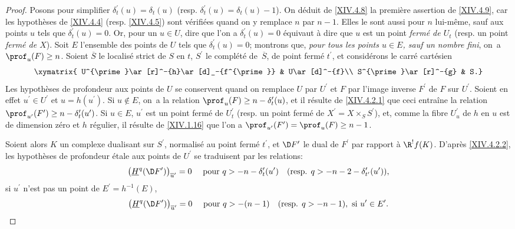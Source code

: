 \begin{proof}
Posons pour simplifier $\delta_{t}^{\prime}(u)=\delta_{t}(u)$ (resp. $\delta_{t}^{\prime}(u)=\delta_{t}(u)-1$). On d\'eduit de \ref{XIV.4.8} la premi\`ere assertion de \ref{XIV.4.9}, car les hypoth\`eses de \ref{XIV.4.4} (resp. \ref{XIV.4.5}) sont v\'erifi\'ees quand on y remplace $n$ par $n-1$. Elles le sont aussi pour $n$ lui-m\^eme, sauf aux points $u$ tels que $\delta_{t}^{\prime}(u)=0$. Or, pour un $u\in U$, dire que l'on a $\delta_{t}^{\prime}(u)=0$ \'equivaut \`a dire que $u$ est un point \emph{fermé de $U_{t}$} (resp. un point \emph{fermé de $X$}). Soit $E$ l'ensemble des points de $U$ tels que $\delta_{t}^{\prime}(u)=0$; montrons que, \emph{pour tous les points $u\in E$, sauf un nombre fini}, on~a $\prof_{u}(F)\geq n$. Soient $\overline{S}$ le localis\'e strict de $S$ en $t$, $S^{\prime}$ le compl\'et\'e de~$\overline{S}$, de point ferm\'e $t^{\prime}$, et consid\'erons le carr\'e cart\'esien
$$
\xymatrix{ U^{\prime}\ar[r]^-{h}\ar[d]_-{f^{\prime}} & U\ar[d]^-{f}\\
S^{\prime}\ar[r]^-{g} & S.}$$
Les hypoth\`eses de profondeur aux points de $U$ se conservent quand on remplace $U$ par $U^{\prime}$ et $F$ par l'image inverse $F^{\prime}$ de $F$ sur $U^{\prime}$. Soient en effet $u^{\prime}\in U^{\prime}$ et $u=h(u^{\prime})$. Si $u\not\in E$, on~a la relation $\prof_{u}(F)\geq n-\delta_{t}^{\prime}(u)$, et il r\'esulte de \ref{XIV.4.2.1} que ceci entra\^ine la relation $\prof_{u^{\prime}}(F^{\prime})\geq n-\delta_{t}^{\prime}(u^{\prime})$. Si $u\in E$, $u^{\prime}$ est un point ferm\'e de $U_{t}^{\prime}$ (resp. un point ferm\'e de $X^{\prime}=X\times_{S}S^{\prime}$), et, comme la fibre $U_{u}^{\prime}$ de $h$ en $u$ est de dimension z\'ero et $h$ r\'egulier, il r\'esulte de \ref{XIV.1.16} que l'on a $\prof_{u^{\prime}}(F^{\prime})=\prof_{u}(F)\geq n-1$.

Soient alors $K$ un complexe dualisant sur $S^{\prime}$, normalis\'e au point ferm\'e $t^{\prime}$, et $\D F^{\prime}$ le dual de $F^{\prime}$ par rapport \`a $\R^{!}f(K)$. D'apr\`es \ref{XIV.4.2.2}, les hypoth\`eses de profondeur \'etale aux points de $U^{\prime}$ se traduisent par les relations:
$$
\big(\underline{H}^{q}(\D F^{\prime})\big)_{\overline{u}^{\prime}}=0\quad\textrm{ pour }q>-n-\delta_{t}^{\prime}(u^{\prime})\quad(\textrm{resp. }q>-n-2-\delta_{t^{\prime}}^{\prime}(u^{\prime})),
$$
si $u^{\prime}$ n'est pas un point de $E^{\prime}=h^{-1}(E)$,
$$
\big(\underline{H}^{q}(\D F^{\prime})\big)_{\overline{u}^{\prime}}=0\quad\textrm{ pour }q>-(n-1)\quad(\textrm{resp. }q>-n-1), \textrm{ si }u^{\prime}\in E^{\prime}.
$$


\end{proof}

